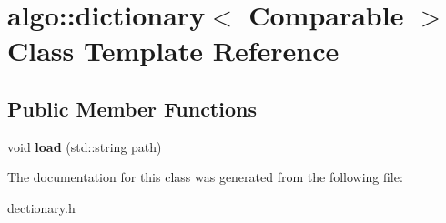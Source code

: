 \hypertarget{classalgo_1_1dictionary}{}\section{algo\+:\+:dictionary$<$ Comparable $>$ Class Template Reference}
\label{classalgo_1_1dictionary}
\subsection*{Public Member Functions}
\begin{DoxyCompactItemize}
\item 
\mbox{\label{classalgo_1_1dictionary_af4363e04405af22104347c301e25050a}} 
void {\bfseries load} (std\+::string path)
\end{DoxyCompactItemize}


The documentation for this class was generated from the following file\+:\begin{DoxyCompactItemize}
\item 
dectionary.\+h\end{DoxyCompactItemize}
